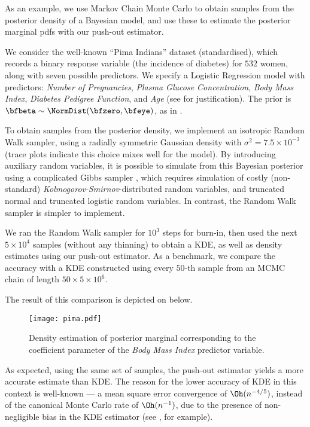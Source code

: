 As an example, we use Markov Chain Monte Carlo to obtain samples from the posterior density of a Bayesian model, and use these to estimate the posterior marginal pdfs with our push-out estimator.

 We consider the well-known ``Pima Indians'' dataset (standardised), which records a binary response variable  (the incidence of diabetes) for $532$ women, along with seven possible predictors. We specify a Logistic Regression model with predictors: {\em Number of Pregnancies}, {\em Plasma Glucose Concentration}, {\em Body Mass Index}, {\em Diabetes Pedigree Function}, and {\em Age} (see \cite{Friel2012} for justification). The prior is $\bfbeta \sim \NormDist(\bfzero, \bfeye)$, as in \cite{Friel2012}.

To obtain samples from the posterior density, we implement an isotropic Random Walk sampler, using a radially symmetric Gaussian density with $\sigma^2 = 7.5\times 10^{-3}$ (trace plots indicate this choice mixes well for the model). By introducing
auxiliary random variables, it is possible to simulate from this Bayesian posterior using a complicated Gibbs sampler \cite[Equation 8]{holmes2006bayesian}, which requires simulation of costly (non-standard) \emph{Kolmogorov-Smirnov}-distributed random variables, and truncated normal and truncated logistic random variables.  In contrast, the Random Walk sampler is simpler to implement.

We ran the Random Walk sampler for $10^3$ steps for burn-in, then used the next $5 \times 10^4$ samples (without any thinning) to obtain a KDE, as well as density estimates using our push-out estimator.  As a benchmark, we  compare the accuracy with a KDE constructed using every $50$-th  sample from an MCMC chain of length $50\times 5 \times 10^6$.

The result of this comparison is depicted on  below.
\begin{figure}[H]
    \centering
    \texttt{[image: pima.pdf]}
    \caption{Density estimation of posterior marginal corresponding to the coefficient parameter of the {\em Body Mass Index} predictor variable.}
    \label{fig:marginal}
\end{figure}

As expected, using the same set of samples, the push-out estimator yields a  more accurate estimate than KDE.
The reason for the lower accuracy of KDE in this context is well-known --- a mean square error convergence of
$\Oh(n^{-4/5})$, instead of the canonical Monte Carlo rate of $\Oh(n^{-1})$, due to the presence of non-negligible bias in the KDE estimator (see \cite{wand1994kernel,botev2010kernel}, for example).

